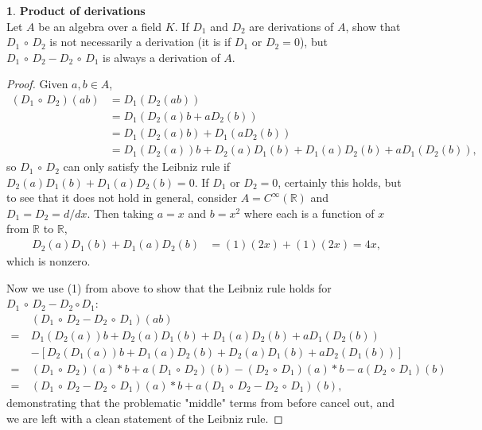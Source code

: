 \documentclass{article}
\theoremstyle{definition}
\newtheorem{ex}{}[section]
\begin{document}
\begin{ex}
	\textbf{Product of derivations} \\
	Let $A$ be an algebra over a field $K$.
	If $D_1$ and $D_2$ are derivations of $A$, show that $D_1\,\circ\,D_2$ is not necessarily a derivation (it is if $D_1$ or $D_2 = 0$), but $D_1\,\circ\,D_2 - D_2\,\circ\,D_1$ is always a derivation of $A$.
\end{ex}
\begin{proof}
	Given $a, b \in A$, \begin{align*}
		(D_1 \,\circ\, D_2)(ab) & = D_1(D_2(ab))                                                       \\
		                        & = D_1(D_2(a)b + aD_2(b))                                             \\
		                        & = D_1(D_2(a)b) + D_1(aD_2(b))                                        \\
		                        & = D_1(D_2(a))b + D_2(a)D_1(b) + D_1(a)D_2(b) + aD_1(D_2(b)), \tag{1}
	\end{align*}
	so $D_1 \,\circ\, D_2$ can only satisfy the Leibniz rule if $D_2(a)D_1(b) + D_1(a)D_2(b) = 0$.
	If $D_1$ or $D_2 = 0$, certainly this holds, but to see that it does not hold in general, consider $A = C^\infty(\mathbb{R})$ and $D_1 = D_2 = d/dx$.
	Then taking $a = x$ and $b = x^2$ where each is a function of $x$ from $\mathbb{R}$ to $\mathbb{R}$, \begin{align*}
		D_2(a)D_1(b) + D_1(a)D_2(b) & = (1)(2x) + (1)(2x) = 4x,
	\end{align*}
	which is nonzero.

	Now we use (1) from above to show that the Leibniz rule holds for $D_1 \,\circ\, D_2 - D_2 \circ D_1$: \begin{align*}
		    & (D_1 \,\circ\, D_2 - D_2 \,\circ\, D_1)(ab)                                                             \\
		=\  & D_1(D_2(a))b + D_2(a)D_1(b) + D_1(a)D_2(b) + aD_1(D_2(b))                                               \\
		    & - [D_2(D_1(a))b + D_1(a)D_2(b) + D_2(a)D_1(b) + aD_2(D_1(b))]                                           \\
		=\  & (D_1 \,\circ\, D_2)(a)*b + a(D_1 \,\circ\, D_2)(b) - (D_2 \,\circ\, D_1)(a)*b - a(D_2 \,\circ\, D_1)(b) \\
		=\  & (D_1 \,\circ\, D_2 - D_2 \,\circ\, D_1)(a)*b + a(D_1 \,\circ\, D_2 - D_2 \,\circ\, D_1)(b),
	\end{align*}
	demonstrating that the problematic "middle" terms from before cancel out, and we are left with a clean statement of the Leibniz rule.
\end{proof}
\end{document}

